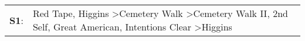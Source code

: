 \begin{supertabular}{p{0.03\textwidth}p{0.92\textwidth}}
 \textbf{S1}:  &  Red Tape\textsuperscript{}, \enspace Higgins\textsuperscript{} \textgreater \enspace Cemetery Walk\textsuperscript{} \textgreater \enspace Cemetery Walk II\textsuperscript{}, \enspace 2nd Self\textsuperscript{}, \enspace Great American\textsuperscript{}, \enspace Intentions Clear\textsuperscript{} \textgreater \enspace Higgins\textsuperscript{}  \enspace  \\
\end{supertabular}
